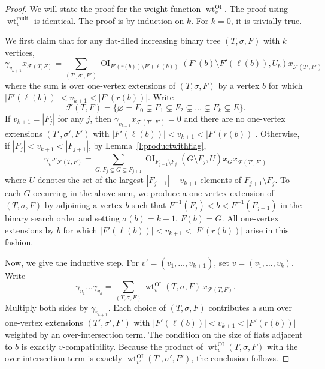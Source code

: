 \documentclass[10pt,a4paper]{amsart}
\numberwithin{equation}{section}
\numberwithin{figure}{section}
\newcommand{\cF}{\mathcal{F}}
\DeclareMathOperator{\OI}{OI}
\DeclareMathOperator{\mult}{mult}
\DeclareMathOperator{\wt}{wt}
\theoremstyle{definition}
\theoremstyle{remark}
\begin{document}
\begin{proof}
    We will state the proof for the weight function $\wt^{\OI}_v$. The proof using $\wt^{\mult}_v$ is identical.
    The proof is by induction on $k$. For $k=0$, it is trivially true.

    We first claim that for any flat-filled increasing binary tree $(T,\sigma,F)$ with $k$ vertices,
    \[\gamma_{v_{k+1}}x_{\cF(T,F)}=\sum_{(T',\sigma',F')} \OI_{F'(r(b))\setminus F'(\ell(b))} (F'(b) \setminus F'(\ell(b)), U_b)x_{\cF(T',F')}
    \]
    where the sum is over one-vertex extensions of $(T,\sigma,F)$ by a vertex $b$ for which $|F'(\ell(b))|<v_{k+1}<|F'(r(b))|$. 
    Write 
    \[\cF(T,F)=\{\varnothing=F_0\subsetneq F_1\subsetneq F_2\subsetneq \dots\subsetneq F_k\subsetneq E\}.\]
    If $v_{k+1}=|F_j|$ for any $j$, then $\gamma_{v_{k+1}}x_{\cF(T',F')}=0$ and there are no one-vertex extensions $(T',\sigma',F')$ with $|F'(\ell(b))|<v_{k+1}<|F'(r(b))|$.
    Otherwise,  if $|F_j|<v_{k+1}<|F_{j+1}|$, by Lemma~\ref{l:productwithflag}, 
    \[\gamma_vx_{\cF(T,F)}=\sum_{G \colon F_j \subsetneq G \subsetneq F_{j+1}}\OI_{F_{j+1}\setminus F_j} (G \setminus F_j, U)x_Gx_{\cF(T',F')}
    \]
    where $U$ denotes the set of the largest $|F_{j+1}|-v_{k+1}$ elements of $F_{j+1}\setminus F_j$.
    To each $G$ occurring in the above sum, we produce a one-vertex extension of $(T,\sigma,F)$ by adjoining a vertex $b$ such that $F^{-1}(F_j)<b<F^{-1}(F_{j+1})$ in the binary search order and setting $\sigma(b)=k+1$, $F(b)=G$. All one-vertex extensions by $b$ for which $|F'(\ell(b))|<v_{k+1}<|F'(r(b))|$ arise in this fashion.

    Now, we give the inductive step. For $v'=(v_1,\dots,v_{k+1})$, set $v=(v_1,\dots,v_k)$. Write
    \[\gamma_{v_1}\dots\gamma_{v_k}=\sum_{(T,\sigma,F)} \wt^{\OI}_v(T,\sigma,F) \, x_{\cF(T,F)}.
    \]
    Multiply both sides by $\gamma_{v_{k+1}}$. Each choice of $(T,\sigma,F)$ contributes a sum over one-vertex extensions $(T',\sigma',F')$ with $|F'(\ell(b))|<v_{k+1}<|F'(r(b))|$ weighted by an over-intersection term. The condition on the size of flats adjacent to $b$ is exactly $v$-compatibility. Because the product of $\wt^{\OI}_v(T,\sigma,F)$ with the over-intersection term is exactly $\wt^{\OI}_{v'}(T',\sigma',F')$, the conclusion follows.
 
\end{proof}
\end{document}
